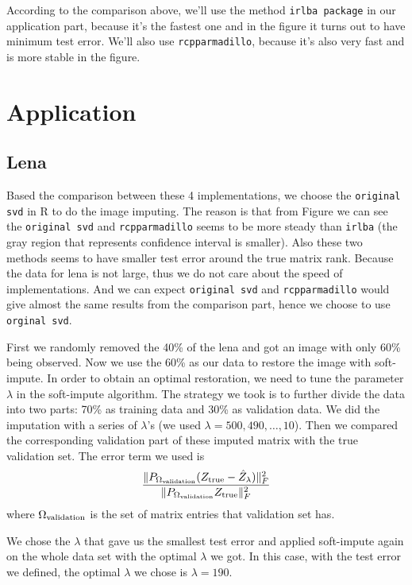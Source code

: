 \documentclass{article}
\begin{document}
According to the comparison above, we'll use the method \verb|irlba package| in our application part, because it's the fastest one and in the figure it turns out to have minimum test error. We'll also use \verb|rcpparmadillo|, because it's also very fast and is more stable in the figure.

	\section{Application}
	\subsection{Lena}
	Based the comparison between these 4 implementations, we choose the \verb|original svd| in R to do the image imputing. The reason is that from {\color{red}Figure} we can see the \verb|original svd| and \verb|rcpparmadillo| seems to be more steady than \verb|irlba| (the gray region that represents confidence interval is smaller). Also these two methods seems to have smaller test error around the true matrix rank. Because the data for lena is not large, thus we do not care about the speed of implementations. And we can expect \verb|original svd| and \verb|rcpparmadillo| would give almost the same results from the comparison part, hence we choose to use \verb|orginal svd|. 

	First we randomly removed the 40\% of the lena and got an image with only 60\% being observed. Now we use the 60\% as our data to restore the image with soft-impute. In order to obtain an optimal restoration, we need to tune the parameter $\lambda$ in the soft-impute algorithm. The strategy we took is to further divide the data into two parts: 70\% as training data and 30\% as validation data. We did the imputation with a series of $\lambda$'s (we used $\lambda = 500, 490, \ldots, 10$). Then we compared the corresponding validation part of these imputed matrix with the true validation set. The error term we used is
	\begin{equation}\label{valid_error}
	\frac{\|P_{\Omega_{\rm validation}}(Z_{\rm true} - \hat{Z}_{\lambda})\|^2_{F}}{\|P_{\Omega_{\rm validation}} Z_{\rm true}\|_{F}^2}
	\end{equation}
	where $\Omega_{\rm validation}$ is the set of matrix entries that validation set has.

	We chose the $\lambda$ that gave us the smallest test error and applied soft-impute again on the whole data set with the optimal $\lambda$ we got. In this case, with the test error we defined, the optimal $\lambda$ we chose is $\lambda = 190$. 
\end{document}
